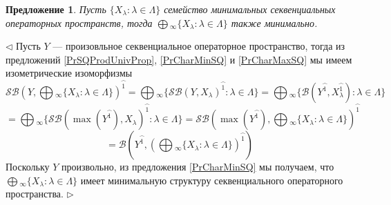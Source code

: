 \documentclass[12pt]{article}
\newtheorem{proposition}[theorem]{Предложение}
\newenvironment{proof}{\par $\triangleleft$}{$\triangleright$}
\begin{document}
\begin{proposition}\label{PrMinCommuteWithProd} Пусть $\{X_\lambda:\lambda\in\Lambda\}$ семейство минимальных секвенциальных операторных пространств, тогда $\bigoplus{}_\infty\{X_\lambda:\lambda\in\Lambda\}$ также минимально.
\end{proposition} 
\begin{proof}
Пусть $Y$ --- произовльное секвенциальное операторное пространство, тогда из предложений \ref{PrSQProdUnivProp}, \ref{PrCharMinSQ} и \ref{PrCharMaxSQ} мы имеем изометрические изоморфизмы
$$
\mathcal{SB}\left(Y,\bigoplus{}_\infty\{X_\lambda:\lambda\in\Lambda\}\right)^{\wideparen{1}}
=\bigoplus{}_\infty\{\mathcal{SB}(Y,X_\lambda)^{\wideparen{1}}:\lambda\in\Lambda\}
=\bigoplus{}_\infty\{\mathcal{B}(Y^{\wideparen{1}},X_\lambda^{\wideparen{1}}):\lambda\in\Lambda\}
$$
$$
=\bigoplus{}_\infty\{\mathcal{SB}(\max(Y^{\wideparen{1}}),X_\lambda)^{\wideparen{1}}:\lambda\in\Lambda\}
=\mathcal{SB}\left(\max(Y^{\wideparen{1}}),\bigoplus{}_\infty\{X_\lambda:\lambda\in\Lambda\}\right)^{\wideparen{1}}
$$
$$
=\mathcal{B}\left(Y^{\wideparen{1}},\left(\bigoplus{}_\infty\{X_\lambda:\lambda\in\Lambda\}\right)^{\wideparen{1}}\right)
$$
Поскольку $Y$ произвольно, из предложения \ref{PrCharMinSQ} мы получаем, что $\bigoplus{}_\infty\{X_\lambda:\lambda\in\Lambda\}$ имеет минимальную структуру секвенциального операторного пространства.
\end{proof}
\end{document}

